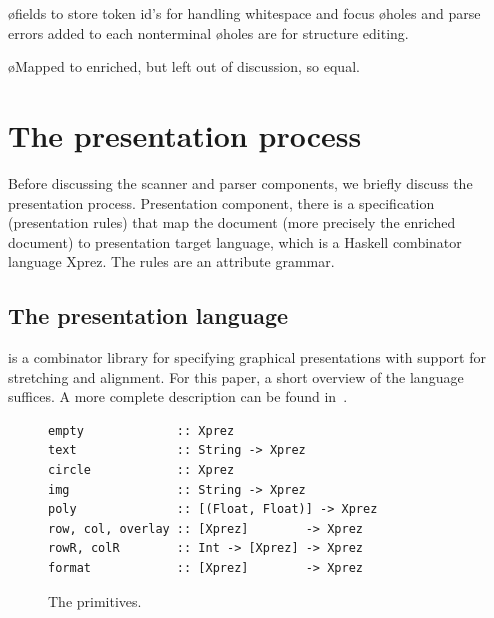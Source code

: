 \documentclass[12pt]{article}
\begin{document}
\bl
\o fields to store token id's for handling whitespace and focus
\o holes and parse errors added to each nonterminal
\o holes are for structure editing.
\el

\bl
\o Mapped to enriched, but left out of discussion, so equal.
\el

\section{The presentation process}

Before discussing the scanner and parser components, we briefly discuss the presentation process. Presentation component, there is a specification (presentation rules) that map the document (more precisely the enriched document) to presentation target language, which is a Haskell combinator language Xprez. The rules are an attribute grammar.

%
\subsection{The {\Xprez} presentation language} \label{sect:xprez}
%

\Xprez is a combinator library for specifying graphical presentations with support for stretching and alignment. For this paper, a short overview of the language suffices. A more complete description can be found in~\cite{schrage04Proxima}.

\begin{figure}
\begin{footnotesize}
\begin{center}
\begin{footnotesize}
\begin{verbatim}
empty             :: Xprez
text              :: String -> Xprez             
circle            :: Xprez                       
img               :: String -> Xprez             
poly              :: [(Float, Float)] -> Xprez 
row, col, overlay :: [Xprez]        -> Xprez          
rowR, colR        :: Int -> [Xprez] -> Xprez   
format            :: [Xprez]        -> Xprez
\end{verbatim}
\end{footnotesize}
\caption{The {\Xprez} primitives.} \label{fig:xprezPrim} 
\end{center}
\end{footnotesize}
\end{figure}
\end{document}
